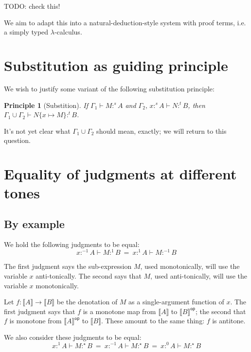 \documentclass{article}
\newtheorem{principle}{Principle}
\newcommand{\todo}[1]{{\color{red}#1}}
\newcommand{\ms}[1]{\ensuremath{\mathsf{#1}}}
\newcommand{\GG}{\Gamma}
\newcommand{\sub}[1]{\{{#1}\}}
\newcommand{\op}{\ms{op}}
\newcommand{\den}[1]{\llbracket{#1}\rrbracket}
\newcommand{\tm}{{\ensuremath{1}}}     %
\newcommand{\ta}{{\ensuremath{-1}}}    %
\newcommand{\ti}{{\ensuremath{\star}}} %
\newcommand{\tb}{{\ensuremath{0}}}     %
\newcommand{\h}[3]{#1 :^{#3}\! {#2}}
\newcommand{\hm}[2]{\h{#1}{#2}{\tm}}
\newcommand{\ha}[2]{\h{#1}{#2}{\ta}}
\newcommand{\hi}[2]{\h{#1}{#2}{\ti}}
\newcommand{\hb}[2]{\h{#1}{#2}{\tb}}
\begin{document}
\todo{TODO: check this!}

We aim to adapt this into a natural-deduction-style system with proof terms,
i.e. a simply typed $\lambda$-calculus.


\section{Substitution as guiding principle}

We wish to justify some variant of the following substitution principle:

\begin{principle}[Substition]
  If $\GG_1 \vdash \h{M}{A}{s}$ and $\GG_2,\, \h{x}{A}{s} \vdash \h{N}{B}{t}$,
  then \(\GG_1 \cup \GG_2 \vdash \h{N\sub{x \mapsto M}}{B}{t}\).
\end{principle}

It's not yet clear what $\GG_1 \cup \GG_2$ should mean, exactly; \todo{we will
  return to this question.}


\section{Equality of judgments at different tones}

\subsection{By example}

We hold the following judgments to be equal:
\begin{equation}\label{eqn:ex1}
 \ha{x}{A} \vdash \hm{M}{B} ~=~ \hm{x}{A} \vdash \ha{M}{B}
\end{equation}

The first judgment says the sub-expression $M$, used monotonically, will use the
variable $x$ anti-tonically. The second says that $M$, used anti-tonically, will
use the variable $x$ monotonically.

Let $f : \den{A} \to \den{B}$ be the denotation of $M$ as a single-argument
function of $x$. The first judgment says that $f$ is a monotone map from
$\den{A}$ to $\den{B}^{\op}$; the second that $f$ is monotone from
$\den{A}^{\op}$ to $\den{B}$. These amount to the same thing: $f$ is
antitone.

We also consider these judgments to be equal:
\begin{equation}
  \hm{x}{A} \vdash \hi{M}{B}
  ~=~
  \ha{x}{A} \vdash \hi{M}{B}
  ~=~
  \hb{x}{A} \vdash \hi{M}{B}
\end{equation}
\end{document}
